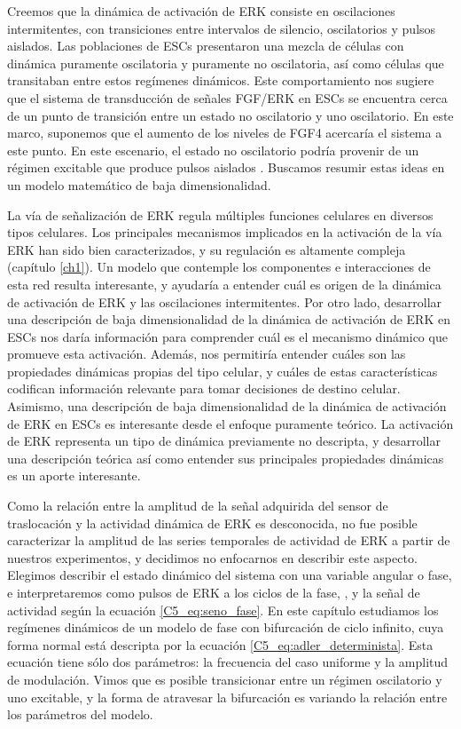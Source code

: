 \documentclass[./main.tex]{subfiles}
\begin{document}
Creemos que la dinámica de activación de ERK consiste en oscilaciones intermitentes, con transiciones entre intervalos de silencio, oscilatorios y pulsos aislados. Las poblaciones de ESCs presentaron una mezcla de células con dinámica puramente oscilatoria y puramente no oscilatoria, así como células que transitaban entre estos regímenes dinámicos. Este comportamiento nos sugiere que el sistema de transducción de señales FGF/ERK en ESCs se encuentra cerca de un punto de transición entre un estado no oscilatorio y uno oscilatorio. En este marco, suponemos que el aumento de los niveles de FGF4 acercaría el sistema a este punto. En este escenario, el estado no oscilatorio podría provenir de un régimen excitable que produce pulsos aislados \cite{Lindner2004}. Buscamos resumir estas ideas en un modelo matemático de baja dimensionalidad.



La vía de señalización de ERK regula múltiples funciones celulares en diversos tipos celulares. Los principales mecanismos implicados en la activación de la vía ERK han sido bien caracterizados, y su regulación es altamente compleja (capítulo \ref{ch1}). Un modelo que contemple los componentes e interacciones de esta red resulta interesante, y ayudaría a entender cuál es origen de la dinámica de activación de ERK y las oscilaciones intermitentes. Por otro lado, desarrollar una descripción de baja dimensionalidad de la dinámica de activación de ERK en ESCs nos daría información para comprender cuál es el mecanismo dinámico que promueve esta activación. Además, nos permitiría entender cuáles son las propiedades dinámicas propias del tipo celular, y cuáles de estas características codifican información relevante para tomar decisiones de destino celular. Asimismo, una descripción de baja dimensionalidad de la dinámica de activación de ERK en ESCs es interesante desde el enfoque puramente teórico. La activación de ERK representa un tipo de dinámica previamente no descripta, y desarrollar una descripción teórica así como entender sus principales propiedades dinámicas es un aporte interesante. 


Como la relación entre la amplitud de la señal adquirida del sensor de traslocación y la actividad dinámica de ERK es desconocida, no fue posible caracterizar la amplitud de las series temporales de actividad de ERK a partir de nuestros experimentos, y decidimos no enfocarnos en describir este aspecto. Elegimos describir el estado dinámico del sistema con una variable angular o fase, e interpretaremos como pulsos de ERK a los ciclos de la fase, , y la señal de actividad según la ecuación \ref{C5_eq:seno_fase}.  En este capítulo estudiamos los regímenes dinámicos de un modelo de fase con bifurcación de ciclo infinito, cuya forma normal está descripta por la ecuación \ref{C5_eq:adler_determinista}.  Esta ecuación tiene sólo dos parámetros: la frecuencia del caso uniforme y la amplitud de modulación. Vimos que es posible transicionar entre un régimen oscilatorio y uno excitable, y la forma de atravesar la bifurcación es variando la relación entre los parámetros del modelo. 
\end{document}
